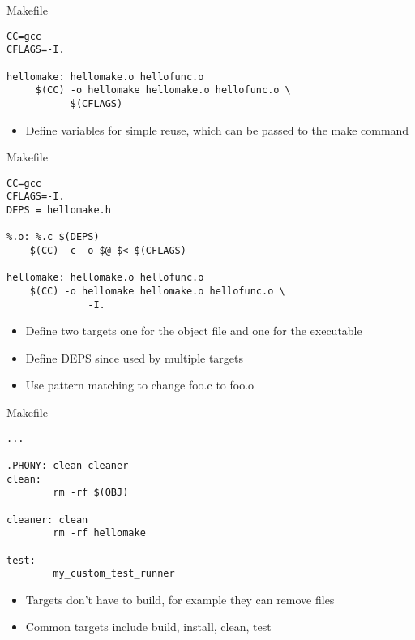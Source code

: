 \documentclass{beamer}
\begin{document}
\begin{frame}[fragile]
\begin{block}{Makefile}
\begin{lstlisting}
CC=gcc
CFLAGS=-I.

hellomake: hellomake.o hellofunc.o
     $(CC) -o hellomake hellomake.o hellofunc.o \
           $(CFLAGS)
\end{lstlisting}
\end{block}
\begin{itemize}
\item Define variables for simple reuse, which can be passed to the make command
\end{itemize}
\end{frame}


\begin{frame}[fragile]
\begin{block}{Makefile}
\begin{lstlisting}
CC=gcc
CFLAGS=-I.
DEPS = hellomake.h

%.o: %.c $(DEPS)
	$(CC) -c -o $@ $< $(CFLAGS)

hellomake: hellomake.o hellofunc.o
	$(CC) -o hellomake hellomake.o hellofunc.o \
              -I.
\end{lstlisting}
\end{block}
\begin{itemize}
\item Define two targets one for the object file and one for the executable
\item Define DEPS since used by multiple targets
\item Use pattern matching to change foo.c to foo.o
\end{itemize}
\end{frame}

\begin{frame}[fragile]
\begin{block}{Makefile}
\begin{lstlisting}
...

.PHONY: clean cleaner
clean:
        rm -rf $(OBJ)

cleaner: clean
        rm -rf hellomake

test:
        my_custom_test_runner
\end{lstlisting}
\end{block}
\begin{itemize}
\item Targets don't have to build, for example they can remove files
\item Common targets include build, install, clean, test
\end{itemize}
\end{frame}
\end{document}

